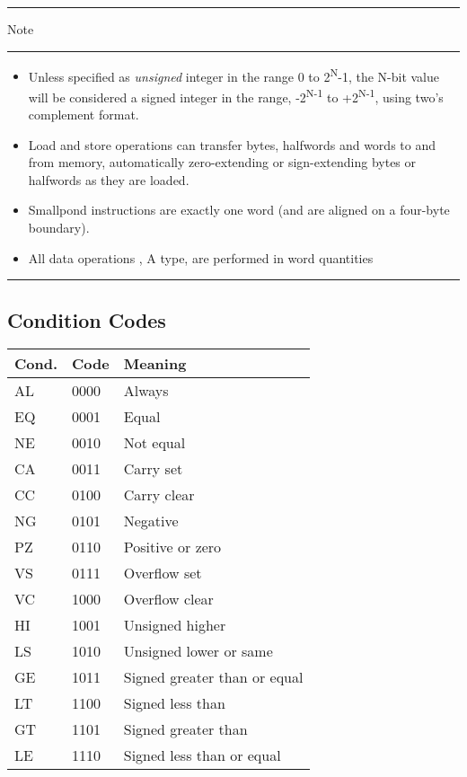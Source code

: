 \documentclass[12pt]{article}
\begin{document}
   \noindent\rule{1.5cm}{0.3pt}Note\rule{1.5cm}{0.3pt}
   
   \begin{itemize}
       \item Unless specified as \textit{unsigned} integer in the range 0 to 2\textsuperscript{N}-1, the N-bit value will be considered a signed integer in the range, -2\textsuperscript{N-1} to +2\textsuperscript{N-1}, using two's complement format.
       
       \item Load and store operations can transfer bytes, halfwords and words to and from memory,
        automatically zero-extending or sign-extending bytes or halfwords as they are loaded.

       \item Smallpond instructions are exactly one word (and are aligned on a four-byte boundary).
       
       \item All data operations , A type, are performed in word quantities
   \end{itemize}
   
   \noindent\rule{4cm}{0.3pt}
   
   \subsection{Condition Codes}   \begin{center}
   \begin{tabular}{|p{1.2cm}|p{2cm}|p{5.0cm}|}
        \hline
        \textbf{Cond.} & \textbf{Code} & \textbf{Meaning}\\
        \hline
        AL & 0000 & Always\\
        \hline
        EQ & 0001 & Equal\\
        \hline
        NE & 0010 & Not equal\\
        \hline
        CA & 0011 & Carry set\\
        \hline
        CC & 0100 & Carry clear\\
        \hline
        NG & 0101 & Negative\\
        \hline
        PZ & 0110 & Positive or zero\\
        \hline
        VS & 0111 & Overflow set\\
        \hline
        VC & 1000 & Overflow clear\\
        \hline
        HI & 1001 & Unsigned higher\\
        \hline
        LS & 1010 & Unsigned lower or same\\
        \hline
        GE & 1011 & Signed greater than or equal\\
        \hline
        LT & 1100 & Signed less than\\
        \hline
        GT & 1101 & Signed greater than\\
        \hline
        LE & 1110 & Signed less than or equal\\
        \hline
   \end{tabular}
   \end{center}
   \newpage
   
\end{document}
